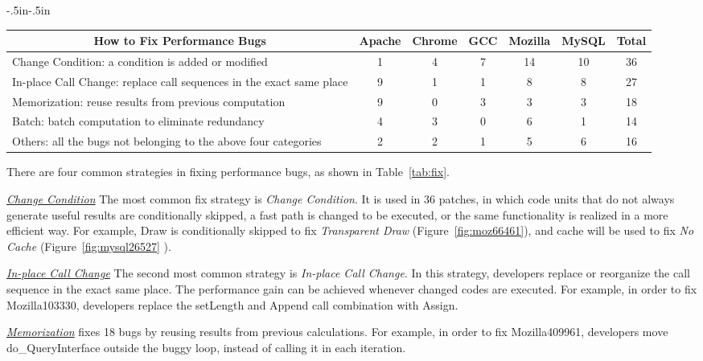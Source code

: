 \begin{table*}[tb!]
\begin{adjustwidth}{-.5in}{-.5in}
\scriptsize
\centering
{
\begin{tabular}{|l|c|c|c|c|c|c|}
\toprule
\multicolumn{1}{|c|}{\bf How to Fix Performance Bugs} &Apache&Chrome&GCC&Mozilla&MySQL&Total\\
\midrule
\multicolumn{1}{|l|}{Change Condition: {a condition is added or modified} }
&1&4&7&14&10&36\\
\midrule
\multicolumn{1}{|l|}{In-place Call Change: {replace call sequences in the exact same place} }
&9&1&1&8&8&27\\
\midrule
\multicolumn{1}{|l|}{Memorization: {reuse results from previous computation}}
&9&0&3&3&3&18\\
\midrule
 \multicolumn{1}{|l|}{Batch: {batch computation to eliminate  redundancy}}
&4&3&0&6&1&14\\
\midrule
\multicolumn{1}{|l|}{Others: all the bugs not belonging to the above four categories}
&2&2&1&5&6&16\\
\bottomrule
\end{tabular}
}
\end{adjustwidth}
\caption{How to fix performance bugs in Section~\ref{sec:char_fix}}
\label{tab:fix}
\end{table*}


There are four common strategies in fixing performance bugs, as shown in Table~\ref{tab:fix}.

\underline{\it Change Condition} The most common fix strategy is {\it Change Condition}. 
It is used in 36 patches, in which code units that do not always generate useful 
results are conditionally skipped, 
a fast path is changed to be executed, or the same functionality is realized in a more efficient way. 
For example, Draw is conditionally skipped to fix {\it Transparent Draw} (Figure~\ref{fig:moz66461}), 
and cache will be used to fix {\it No Cache} (Figure~\ref{fig:mysql26527} ).

\underline{\it In-place Call Change} The second most common strategy is {\it In-place Call Change}. 
In this strategy, developers replace or reorganize the call sequence in the exact same place. 
The performance gain can be achieved whenever changed codes are executed. 
For example, in order to fix Mozilla103330, 
developers replace the setLength and Append call combination with Assign.

\underline{\it Memorization} fixes 18 bugs by reusing results 
from previous calculations. 
For example, in order to fix Mozilla409961, 
developers move do\_QueryInterface outside the buggy loop, instead of calling it in each iteration.  

